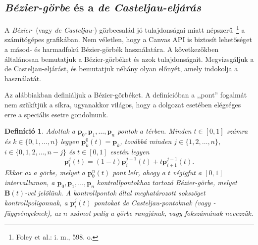 \documentclass[12pt]{report}
\newtheorem{defi}[tét]{Definíció}
\theoremstyle{definition}
\begin{document}
    \subsection*{\emph{Bézier-görbe} és a \emph{de Casteljau-eljárás}}
    \label{sec:Bézier:de:Casteljau}

A \emph{Bézier}- (vagy \emph{de Casteljau-}) görbecsalád jó tulajdonságai miatt
népszerű~\footnote{Foley et al.: i. m., 598. o.} a számítógépes grafikában. Nem
véletlen, hogy a Canvas API is biztosít lehetőséget a másod- és harmadfokú Bézier-görbék
használatára. A következőkben általánosan bemutatjuk a Bézier-görbéket és azok
tulajdonságait. Megvizsgáljuk a de Casteljau-eljárást, és bemutatjuk néhány
olyan előnyét, amely indokolja a használatát.

Az alábbiakban definiáljuk a Bézier-görbéket. A definícióban a ,,pont'' fogalmát
nem szűkítjük a síkra, ugyanakkor világos, hogy a dolgozat esetében elégséges
erre a speciális esetre gondolnunk.


\begin{defi}\label{def:Bézier}\cite[Kurusa]{Kurusa:1999:szamitogepes} Adottak a
$\boldsymbol{p}_0,\boldsymbol{p}_1,\dots,\boldsymbol{p}_n$ pontok a térben.
Minden $t \in [0,1]$ számra és $k \in \{0,1,\dots,n\}$ legyen
$\boldsymbol{p}^0_k(t) = \boldsymbol{p}_k$, továbbá minden $j \in
\{1,2,\dots,n\}$, $i \in \{0,1,2,\dots,n-j\}$ és $t \in [0,1]$ esetén legyen
\[\boldsymbol{p}^j_i(t) = (1-t)\boldsymbol{p}^{j-1}_i(t) +
t\boldsymbol{p}^{j-1}_{i+1}(t).\] Ekkor az a görbe, melyet a
$\boldsymbol{p}^n_0(t)$ pont leír, ahogy a $t$ végigfut a $[0,1]$
intervallumon, a $\boldsymbol{p}_0,\boldsymbol{p}_1,\dots,\boldsymbol{p}_n$
\emph{kontrollpontokhoz} tartozó \emph{Bézier-görbe}, melyet
$\boldsymbol{B}(t)$-vel jelölünk. A kontrollpontok által meghatározott
sokszöget \emph{kontrollpoligonnak}, a $\boldsymbol{p}^j_i(t)$ pontokat
\emph{de Casteljau-pontoknak} (vagy \emph{-függvényeknek}), az $n$ számot pedig
a görbe \emph{rangjának}, vagy \emph{fokszámának} nevezzük.\end{defi}
\end{document}
